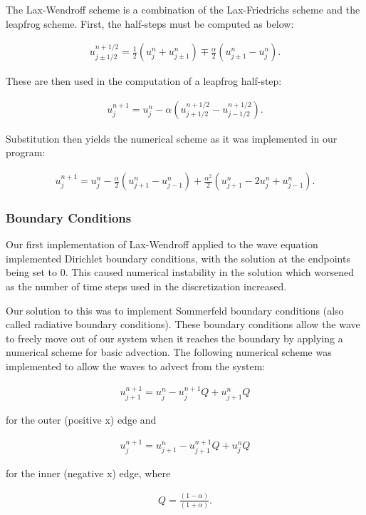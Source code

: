 \documentclass[../main.tex]{subfiles}
\begin{document}
The Lax-Wendroff scheme \cite{rezzolla} is a combination of the Lax-Friedrichs scheme and the leapfrog scheme. First, the half-steps must be computed as below:

\begin{gather}
	u^{n+1/2}_{j\pm1/2} = \frac{1}{2}(u^{n}_{j}+u^{n}_{j\pm1}) \mp \frac{\alpha}{2}(u^{n}_{j\pm1}-u^{n}_j).
\end{gather}

\noindent These are then used in the computation of a leapfrog half-step:

\begin{gather}
	u^{n+1}_{j} = u^{n}_{j}-\alpha(u^{n+1/2}_{j+1/2}-u^{n+1/2}_{j-1/2}).
\end{gather}

\noindent Substitution then yields the numerical scheme as it was implemented in our program:

\begin{gather}
	u^{n+1}_{j} = u^n_j - \frac{\alpha}{2}(u^{n}_{j+1}-u^n_{j-1}) + \frac{\alpha^2}{2}(u^{n}_{j+1}-2u^n_j+u^n_{j-1}).
\end{gather}

\subsubsection{Boundary Conditions}

Our first implementation of Lax-Wendroff applied to the wave equation implemented Dirichlet boundary conditions, with the solution at the endpoints being set to $0$. This caused numerical instability in the solution which worsened as the number of time steps used in the discretization increased.

Our solution to this was to implement Sommerfeld boundary conditions (also called radiative boundary conditions). These boundary conditions allow the wave to freely move out of our system when it reaches the boundary by applying a numerical scheme for basic advection. The following numerical scheme was implemented to allow the waves to advect from the system:

\begin{gather}
	u^{n+1}_{j+1} = u^n_j - u^{n+1}_jQ+u^n_{j+1}Q	
\end{gather}

\noindent for the outer (positive x) edge and 

\begin{gather}
	u^{n+1}_j = u^n_{j+1}-u^{n+1}_{j+1}Q+u^n_jQ
\end{gather}

\noindent for the inner (negative x) edge, where 

\begin{gather}
	Q = \frac{(1-\alpha)}{(1+\alpha)}.
\end{gather}
\end{document}
